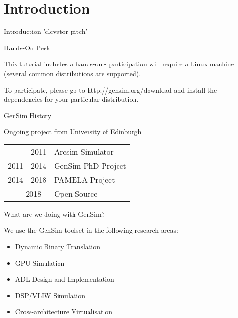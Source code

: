 
\section{Introduction}

\begin{frame}{Introduction}
'elevator pitch'
\end{frame}

\begin{frame}{Hands-On Peek}

This tutorial includes a hands-on - participation will require a Linux
machine (several common distributions are supported).

\bigskip

To participate, please go to http://gensim.org/download and install
the dependencies for your particular distribution.

\end{frame}

\begin{frame}{GenSim History}


\centering
Ongoing project from University of Edinburgh

\smallskip

\begin{tabular}{r l}
\phantom{0000} - 2011 & Arcsim Simulator \\
2011 - 2014 & GenSim PhD Project \\
2014 - 2018 & PAMELA Project \\
2018 - \phantom{0000}        & Open Source
\end{tabular}

\end{frame}

\begin{frame}{What are we doing with GenSim?}

We use the GenSim toolset in the following research areas:

\begin{itemize}
\item Dynamic Binary Translation
\item GPU Simulation
\item ADL Design and Implementation
\item DSP/VLIW Simulation
\item Cross-architecture Virtualisation
\end{itemize}

\end{frame}

